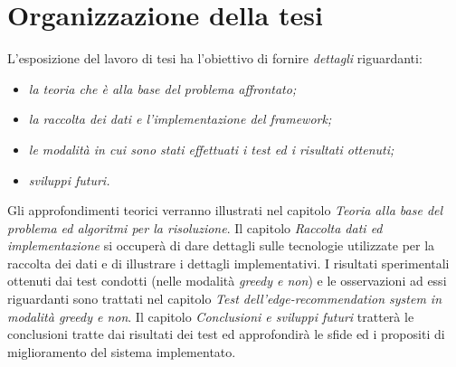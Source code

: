 \section{Organizzazione della tesi}
\label{sec:organizzazione}
L'esposizione del lavoro di tesi ha l'obiettivo di fornire \textit{dettagli} riguardanti:
\begin{itemize}
\item \textit{la teoria che è alla base del problema affrontato;}
\item \textit{la raccolta dei dati e l'implementazione del framework;}
\item \textit{le modalità in cui sono stati effettuati i test ed i risultati ottenuti;}
\item \textit{sviluppi futuri.}
\end{itemize}
Gli approfondimenti teorici verranno illustrati nel capitolo \textit{Teoria alla base del problema ed algoritmi per la risoluzione}. Il capitolo \textit{Raccolta dati ed implementazione} si occuperà di dare dettagli sulle tecnologie utilizzate per la raccolta dei dati e di illustrare i dettagli implementativi. I risultati sperimentali ottenuti dai test condotti (nelle modalità \textit{greedy e non}) e le osservazioni ad essi riguardanti sono trattati nel capitolo \textit{Test dell'edge-recommendation system in modalità greedy e non}. Il capitolo \textit{Conclusioni e sviluppi futuri} tratterà le conclusioni tratte dai risultati dei test ed approfondirà le sfide ed i propositi di miglioramento del sistema implementato.


%



